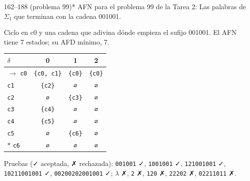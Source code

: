 \documentclass[11pt]{article}
\begin{document}
\begin{ejercicio}{162--188 (problema 99)}{*}
AFN para el problema 99 de la Tarea 2: Las palabras de $\Sigma_1$ que terminan con la cadena 001001.
\end{ejercicio}
\proc Ciclo en c0 y una cadena que adivina dónde empieza el sufijo 001001. El AFN tiene 7 estados; su AFD mínimo, 7.
\begin{center}\small\begin{tabular}{lccc}\toprule
$\delta$ & 0 & 1 & 2 \\\midrule
$\to$ \texttt{c0} & \texttt{\{c0, c1\}} & \texttt{\{c0\}} & \texttt{\{c0\}} \\
 \texttt{c1} & \texttt{\{c2\}} & \texttt{∅} & \texttt{∅} \\
 \texttt{c2} & \texttt{∅} & \texttt{\{c3\}} & \texttt{∅} \\
 \texttt{c3} & \texttt{\{c4\}} & \texttt{∅} & \texttt{∅} \\
 \texttt{c4} & \texttt{\{c5\}} & \texttt{∅} & \texttt{∅} \\
 \texttt{c5} & \texttt{∅} & \texttt{\{c6\}} & \texttt{∅} \\
$*$ \texttt{c6} & \texttt{∅} & \texttt{∅} & \texttt{∅} \\
\bottomrule\end{tabular}\end{center}
Pruebas (✓ aceptada, ✗ rechazada): \texttt{001001} ✓, \texttt{1001001} ✓, \texttt{121001001} ✓, \texttt{10211001001} ✓, \texttt{00200202001001} ✓; $\lambda$ ✗, \texttt{2} ✗, \texttt{120} ✗, \texttt{22202} ✗, \texttt{02211011} ✗.
\end{document}
